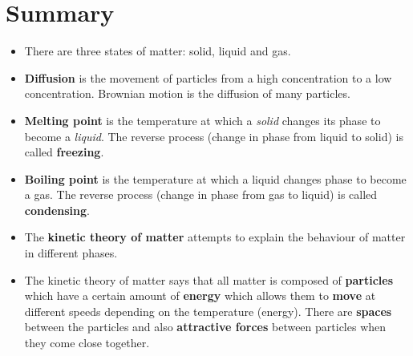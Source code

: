            \section{Summary}
            \nopagebreak
\label{m38730*id311034}\begin{itemize}[noitemsep]
\label{m38730*id973}\item There are three states of matter: solid, liquid and gas.
\label{m38730*id872}\item \textbf{Diffusion} is the movement of particles from a high concentration to a low concentration. Brownian motion is the diffusion of many particles.
\label{m38730*uid83}\item \textbf{Melting point} is the temperature at which a \textsl{solid} changes its 
phase to become a \textsl{liquid}. The reverse process (change in phase from liquid to solid) is called \textbf{freezing}.
\label{m38730*uid84}\item \textbf{Boiling point} is the temperature at which a liquid changes phase to become a gas. The reverse process (change in phase from gas to liquid) is called \textbf{condensing}. 
\item The \textbf{kinetic theory of matter} attempts to explain the behaviour of matter in different phases.
\label{m38730*uid81}\item The kinetic theory of matter says that all matter is composed of \textbf{particles} which have a certain amount of \textbf{energy} which allows them to \textbf{move} at different speeds depending on the temperature (energy). There are \textbf{spaces} between the particles and also \textbf{attractive forces} between particles when they come close together.
\end{itemize}
\label{m38730*cid9}
